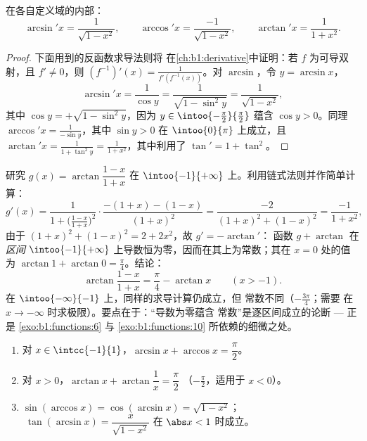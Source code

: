 \begin{proposition}[导数]\label{prop:b1:functions:arcderiv}
在各自定义域的内部：
\[
\arcsin' x = \frac{1}{\sqrt{1 - x^2}},
\qquad
\arccos' x = \frac{-1}{\sqrt{1 - x^2}},
\qquad
\arctan' x = \frac{1}{1 + x^2}.
\]
\end{proposition}

\begin{proof}
下面用到的反函数求导法则将
在\cref{ch:b1:derivative}中证明：若 $f$ 为可导双射，且
$f' \neq 0$，则 $(f^{-1})'(x) = \frac{1}{f'(f^{-1}(x))}$。对
$\arcsin$，令 $y = \arcsin x$，
\[
\arcsin' x = \frac{1}{\cos y}
= \frac{1}{\sqrt{1 - \sin^2 y}} = \frac{1}{\sqrt{1 - x^2}},
\]
其中 $\cos y = +\sqrt{1 - \sin^2 y}$，因为 $y \in
\intoo{-\frac\pi2}{\frac\pi2}$ 蕴含 $\cos y > 0$。同理
$\arccos' x = \frac{1}{-\sin y}$，其中 $\sin y > 0$ 在
$\intoo{0}{\pi}$ 上成立，且 $\arctan' x = \frac{1}{1 + \tan^2 y} =
\frac{1}{1 + x^2}$，其中利用了 $\tan' = 1 + \tan^2$。
\end{proof}

\begin{example}[识别隐藏的常数]\label{ex:b1:functions:hiddenconst}
研究 $g(x) = \arctan\dfrac{1 - x}{1 + x}$ 在 $\intoo{-1}
{+\infty}$ 上。利用链式法则并作简单计算：
\[
g'(x) = \frac{1}{1 + \bigl(\frac{1-x}{1+x}\bigr)^2}\cdot
\frac{-(1+x) - (1-x)}{(1+x)^2}
= \frac{-2}{(1+x)^2 + (1-x)^2}
= \frac{-1}{1 + x^2} ,
\]
由于 $(1+x)^2 + (1-x)^2 = 2 + 2x^2$，故 $g' = -\arctan'$：
函数 $g + \arctan$ 在\emph{区间}
$\intoo{-1}{+\infty}$ 上导数恒为零，因而在其上为常数；其在 $x =
0$ 处的值为 $\arctan 1 + \arctan 0 = \frac\pi4$。结论：
\[
\arctan\frac{1 - x}{1 + x} = \frac\pi4 - \arctan x
\qquad (x > -1) .
\]
在 $\intoo{-\infty}{-1}$ 上，同样的求导计算仍成立，但
常数不同（$-\frac{3\pi}4$；需要
在 $x \to -\infty$ 时求极限）。要点在于：“导数为零蕴含
常数”是逐区间成立的论断 --- 正是
\cref{exo:b1:functions:6} 与
\cref{exo:b1:functions:10} 所依赖的细微之处。
\end{example}

\begin{proposition}[常用恒等式]\label{prop:b1:functions:arcidentities}
\begin{enumerate}
  \item 对 $x \in \intcc{-1}{1}$，$\arcsin x + \arccos x =
        \dfrac{\pi}{2}$。
  \item 对 $x > 0$，$\arctan x + \arctan\dfrac 1x = \dfrac{\pi}{2}$
        （$-\frac\pi2$，适用于 $x < 0$）。
  \item $\sin(\arccos x) = \cos(\arcsin x) = \sqrt{1 - x^2}$；
        $\;\tan(\arcsin x) = \dfrac{x}{\sqrt{1 - x^2}}$ 在
        $\abs x < 1$ 时成立。
\end{enumerate}
\end{proposition}

